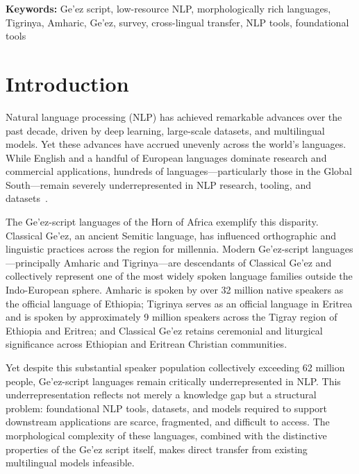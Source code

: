 \documentclass[12pt,a4paper]{article}
\theoremstyle{plain}
\theoremstyle{definition}
\begin{document}
\noindent\textbf{Keywords:} Ge'ez script, low-resource NLP, morphologically rich languages, Tigrinya, Amharic, Ge'ez, survey, cross-lingual transfer, NLP tools, foundational tools


\section{Introduction}
\label{sec:introduction}

Natural language processing (NLP) has achieved remarkable advances over the past decade, driven by deep learning, large-scale datasets, and multilingual models. Yet these advances have accrued unevenly across the world's languages. While English and a handful of European languages dominate research and commercial applications, hundreds of languages---particularly those in the Global South---remain severely underrepresented in NLP research, tooling, and datasets~\cite{joshi_state_2020}.

The Ge'ez-script languages of the Horn of Africa exemplify this disparity. Classical Ge'ez, an ancient Semitic language, has influenced orthographic and linguistic practices across the region for millennia. Modern Ge'ez-script languages---principally Amharic and Tigrinya---are descendants of Classical Ge'ez and collectively represent one of the most widely spoken language families outside the Indo-European sphere. Amharic is spoken by over 32 million native speakers as the official language of Ethiopia; Tigrinya serves as an official language in Eritrea and is spoken by approximately 9 million speakers across the Tigray region of Ethiopia and Eritrea; and Classical Ge'ez retains ceremonial and liturgical significance across Ethiopian and Eritrean Christian communities.

Yet despite this substantial speaker population collectively exceeding 62 million people, Ge'ez-script languages remain critically underrepresented in NLP. This underrepresentation reflects not merely a knowledge gap but a structural problem: foundational NLP tools, datasets, and models required to support downstream applications are scarce, fragmented, and difficult to access. The morphological complexity of these languages, combined with the distinctive properties of the Ge'ez script itself, makes direct transfer from existing multilingual models infeasible.
\end{document}
